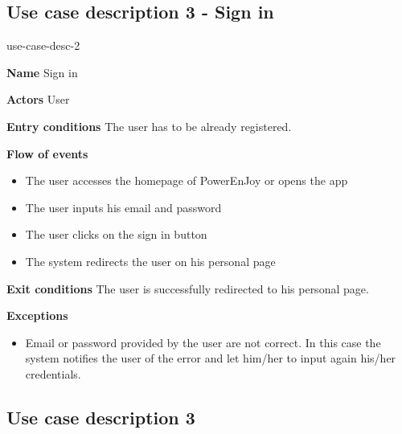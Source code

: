 \subsection{Use case description 3 - Sign in}
\begin{labeling}{use-case-desc-2}
		\item[\textbf{Name}] Sign in
		\item[\textbf{Actors}] User
		\item[\textbf{Entry conditions}] The user has to be already registered.
		\item[\textbf{Flow of events}]
			\begin{itemize}
				\item[]
				\item The user accesses the homepage of PowerEnJoy or opens the app
				\item The user inputs his email and password
				\item The user clicks on the sign in button
				\item The system redirects the user on his personal page
			\end{itemize}
		\item[\textbf{Exit conditions}] The user is successfully redirected to his personal page.
		\item[\textbf{Exceptions}]
			\begin{itemize}
				\item[]
				\item Email or password provided by the user are not correct. In this case the system notifies the user of the error and let him/her to input again his/her credentials. 
			\end{itemize}
	\end{labeling}
	
\subsection{Use case description 3}
